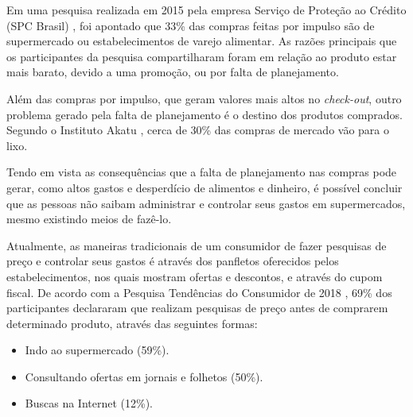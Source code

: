 Em uma pesquisa realizada em 2015 pela empresa Serviço de Proteção ao Crédito (SPC Brasil) \cite{SPC}, foi apontado que 33\% das compras feitas por impulso são de supermercado ou estabelecimentos de varejo alimentar. As razões principais que os participantes da pesquisa compartilharam foram em relação ao produto estar mais barato, devido a uma promoção, ou por falta de planejamento.

Além das compras por impulso, que geram valores mais altos no \textit{check-out}, outro problema gerado pela falta de planejamento é o destino dos produtos comprados. Segundo o Instituto Akatu \cite{Akatu}, cerca de 30\% das compras de mercado vão para o lixo.

Tendo em vista as consequências que a falta de planejamento nas compras pode gerar, como altos gastos e desperdício de alimentos e dinheiro, é possível concluir que as pessoas não saibam administrar e controlar seus gastos em supermercados, mesmo existindo meios de fazê-lo.

Atualmente, as maneiras tradicionais de um consumidor de fazer pesquisas de preço e controlar seus gastos é através dos panfletos oferecidos pelos estabelecimentos, nos quais mostram ofertas e descontos, e através do cupom fiscal. De acordo com a Pesquisa Tendências do Consumidor de 2018 \cite{PesquisaAPAS}, 69\% dos participantes declararam que realizam pesquisas de preço antes de comprarem determinado produto, através das seguintes formas:
\begin{itemize}
\item Indo ao supermercado (59\%).
\item Consultando ofertas em jornais e folhetos (50\%).
\item Buscas na Internet (12\%).
\end{itemize}

